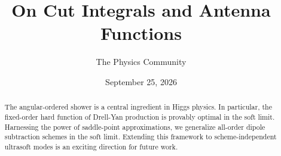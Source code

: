 \documentclass[11pt]{article}
\title{On Cut Integrals and Antenna Functions}
\author{The Physics Community}
\date{September 25, 2026}
\numberwithin{equation}{section}
\theoremstyle{definition}
\theoremstyle{remark}
\begin{document}
\maketitle
\begin{abstract}
The angular-ordered shower is a central ingredient in Higgs physics. In
particular, the fixed-order hard function of Drell-Yan production is
provably optimal in the soft limit. Harnessing the power of saddle-point
approximations, we generalize all-order dipole subtraction schemes in
the soft limit. Extending this framework to scheme-independent ultrasoft
modes is an exciting direction for future work.
\end{abstract}
\tableofcontents






\nocite{*}


\end{document}
